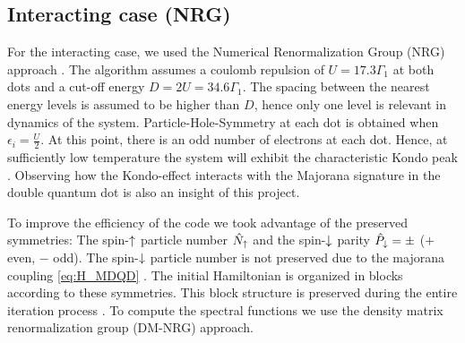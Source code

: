 \documentclass[showpacs,aps,prb,reprint,superscriptaddress]{revtex4-1}
\begin{document}
\subsection{Interacting case (NRG)}
For the interacting case, we used the Numerical Renormalization Group (NRG) approach \cite{wilson_renormalization_1975,sindel_numerical_2005,bulla_numerical_2008}. The algorithm assumes a coulomb repulsion of $U =17.3\Gamma_1$ at both dots and a cut-off energy $D=2U=34.6\Gamma_1$. The spacing between the nearest energy levels is assumed to be higher than $D$, hence only one level is relevant in dynamics of the system. Particle-Hole-Symmetry at each dot is obtained when  $\epsilon_i = \frac{U}{2}$. At this point, there is an odd number of electrons at each dot. Hence, at sufficiently low temperature the system will exhibit the characteristic Kondo peak \citet{wilson_renormalization_1975}. Observing how the Kondo-effect interacts with the Majorana signature in the double quantum dot is also an insight of this project. 


To  improve the efficiency of the code we took advantage of the preserved symmetries: The spin-$\uparrow$ particle number $\hat{N}_\uparrow$ and the spin-$\downarrow$ parity $\hat{P}_\downarrow = \pm $ ($+$ even, $-$ odd). The spin-$\downarrow$ particle number is not preserved due to the majorana coupling \eqref{eq:H_MDQD} . The initial Hamiltonian is organized in blocks according to these symmetries. This block structure is preserved during the entire iteration process \cite{bulla_numerical_2008}. To compute the spectral functions we use the density matrix renormalization group (DM-NRG) approach. \cite{hofstetter_generalized_2000}
  
\end{document}
